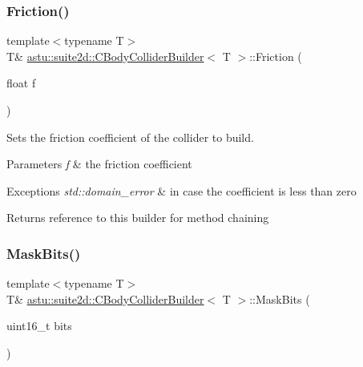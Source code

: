 \subsubsection{\texorpdfstring{Friction()}{Friction()}}
{\footnotesize\ttfamily template$<$typename T$>$ \\
T\& \hyperlink{classastu_1_1suite2d_1_1CBodyColliderBuilder}{astu\+::suite2d\+::\+C\+Body\+Collider\+Builder}$<$ T $>$\+::Friction (\begin{DoxyParamCaption}\item[{float}]{f }\end{DoxyParamCaption})\hspace{0.3cm}{\ttfamily [inline]}}

Sets the friction coefficient of the collider to build.


\begin{DoxyParams}{Parameters}
{\em f} & the friction coefficient \\
\hline
\end{DoxyParams}

\begin{DoxyExceptions}{Exceptions}
{\em std\+::domain\+\_\+error} & in case the coefficient is less than zero \\
\hline
\end{DoxyExceptions}
\begin{DoxyReturn}{Returns}
reference to this builder for method chaining 
\end{DoxyReturn}
\mbox{\label{classastu_1_1suite2d_1_1CBodyColliderBuilder_a20924e4c791d492ce399ac5a340a6fab}} 
\subsubsection{\texorpdfstring{Mask\+Bits()}{MaskBits()}}
{\footnotesize\ttfamily template$<$typename T$>$ \\
T\& \hyperlink{classastu_1_1suite2d_1_1CBodyColliderBuilder}{astu\+::suite2d\+::\+C\+Body\+Collider\+Builder}$<$ T $>$\+::Mask\+Bits (\begin{DoxyParamCaption}\item[{uint16\+\_\+t}]{bits }\end{DoxyParamCaption})\hspace{0.3cm}{\ttfamily [inline]}}

